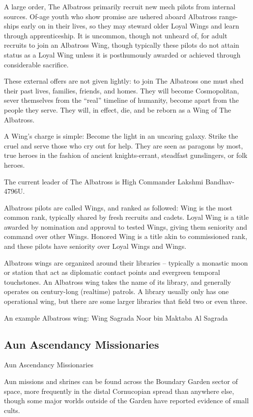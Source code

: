 A large order, The Albatross primarily recruit new mech pilots from internal
sources. Of-age youth who show promise are ushered aboard Albatross range-ships
early on in their lives, so they may steward older Loyal Wings and learn through
apprenticeship. It is uncommon, though not unheard of, for adult recruits to
join an Albatross Wing, though typically these pilots do not attain status as a
Loyal Wing unless it is posthumously awarded or achieved through considerable
sacrifice.

These external offers are not given lightly: to join The Albatross one must shed
their past lives, families, friends, and homes. They will become Cosmopolitan,
sever themselves from the “real” timeline of humanity, become apart from the
people they serve. They will, in effect, die, and be reborn as a Wing of The
Albatross.

A Wing’s charge is simple: Become the light in an uncaring galaxy. Strike the
cruel and serve those who cry out for help. They are seen as paragons by most,
true heroes in the fashion of ancient knights-errant, steadfast gunslingers, or
folk heroes.

The current leader of The Albatross is High Commander Lakshmi Bandhav-4796U.

Albatross pilots are called Wings, and ranked as followed: Wing is the most
common rank, typically shared by fresh recruits and cadets. Loyal Wing is a
title awarded by nomination and approval to tested Wings, giving them seniority
and command over other Wings. Honored Wing is a title akin to commissioned rank,
and these pilots have seniority over Loyal Wings and Wings.

Albatross wings are organized around their libraries -- typically a monastic
moon or station that act as diplomatic contact points and evergreen temporal
touchstones. An Albatross wing takes the name of its library, and generally
operates on century-long (realtime) patrols. A library usually only has one
operational wing, but there are some larger libraries that field two or even
three.

An example Albatross wing: Wing Sagrada Noor bin Maktaba Al Sagrada

\subsection{Aun Ascendancy Missionaries}
Aun Ascendancy Missionaries

Aun missions and shrines can be found across the Boundary Garden sector of space, more
frequently in the distal Cornucopian spread than anywhere else, though some major worlds
outside of the Garden have reported evidence of small cults.



